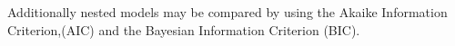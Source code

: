 \documentclass[12pt, a4paper]{report}
\theoremstyle{plain}
\theoremstyle{definition}
\theoremstyle{remark}
\begin{document}
	
	Additionally nested models may be compared by using the Akaike Information Criterion,(AIC) and the Bayesian Information Criterion (BIC).
	
	

	
%	
	
	
	
	
	
	
	
\end{document}
